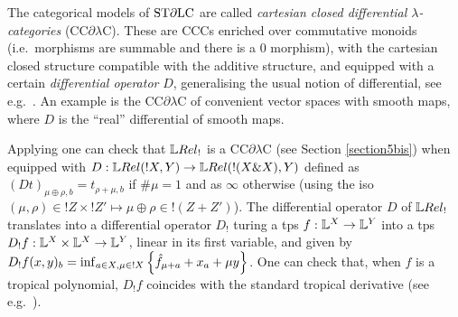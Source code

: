 The categorical models of $\mathrm{ST}\partial\mathrm{LC}$ are called \emph{cartesian closed
 differential $\lambda$-categories} (CC$\partial\lambda$C)\cite{Manzo2010,Blute2009, Blute2019}. These are CCCs enriched over commutative monoids (i.e.\ morphisms are summable and there is a $0$ morphism), with the cartesian closed structure compatible with the additive structure, 
and equipped with a certain \emph{differential operator} $D$, generalising the usual notion of differential, see e.g.\ \cite{BluteEhrhTass10}.
An example is the CC$\partial\lambda$C of convenient vector spaces with smooth maps, where $D$ is the ``real'' differential of smooth maps.

Applying \cite[Theorem 6.1]{lemay2020} one can check that
 $\LREL_!$ is a CC$\partial\lambda$C (see Section \ref{section5bis}) when equipped with $D:\HOM{\LREL}{!X}{Y}\to \HOM{\LREL}{!(X\& X)}{Y}$ defined as $(Dt)_{\mu\oplus\rho,b}=t_{\rho+\mu,b}$ if $\#\mu=1$ and as $\infty$ otherwise (using the iso $(\mu,\rho)\in !Z\times !Z'\mapsto\mu\oplus\rho \in !(Z+Z')$).
 The differential operator $D$ of $\LREL_{!}$ translates into a differential operator $D_{!}$ turing a tps $f:\mathbb{L}^{X}\to \mathbb{L}^{Y}$ into a tps $D_{!}f:\mathbb{L}^{X}\times \mathbb{L}^{X}\to \mathbb{L}^{Y}$, linear in its first variable, and given by 
$D_{!}f(x,y)_{b}=\inf_{a\in X, \mu\in !X}\left\{\hat{f}_{\mu+a}+x_{a}+\mu y\right\}$. One can check that, when $f$ is a tropical polynomial, $D_{!}f$ coincides with the standard tropical derivative (see e.g.~\cite{Grigoriev2017}).

